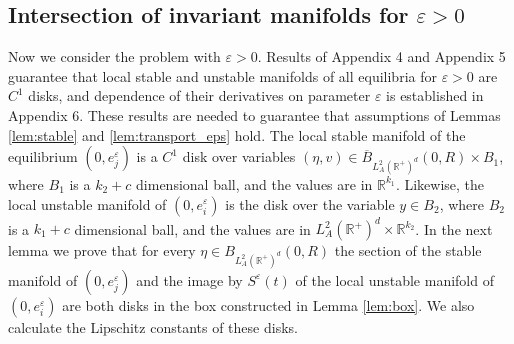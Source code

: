 \documentclass[11pt, leqno]{amsart}
\theoremstyle{definition}
\def\R{\mathbb{R}}
\begin{document}
\subsection{Intersection of invariant manifolds for $\varepsilon >0$}


Now we consider the problem with $\varepsilon>0$. Results of Appendix 4 and Appendix 5 guarantee that local stable and unstable manifolds of all equilibria for $\varepsilon>0$ are $C^1$ disks, and dependence of their derivatives on parameter $\varepsilon$ is established in Appendix 6. These results are needed to guarantee that assumptions of Lemmas \ref{lem:stable} and \ref{lem:transport_eps} hold. The local stable manifold of the equilibrium $(0,e_j^\varepsilon)$ is a $C^1$ disk over variables $(\eta,v) \in \overline{B}_{L^2_A( \R^+)^d}(0,R) \times B_1$, where $B_1$ is a $k_2+c$ dimensional ball, and the values are in $\R^{k_1}$. Likewise, the local unstable manifold of $(0,e_i^\varepsilon)$ is the disk over the variable $y \in B_2$, where $B_2$ is a $k_1+c$ dimensional ball, and the values are in $L^2_A( \R^+)^d \times \mathbb{R}^{k_2}$. In the next lemma we prove that for every $\eta \in B_{L^2_A( \R^+)^d}(0,R)$ the section of the stable manifold of $(0,e_j^\varepsilon)$   and the image by $S^\varepsilon(t)$ of the local unstable manifold of $(0,e_i^\varepsilon)$ are both disks in the box constructed in Lemma   \ref{lem:box}. We also  calculate the Lipschitz constants of these disks.
\end{document}
